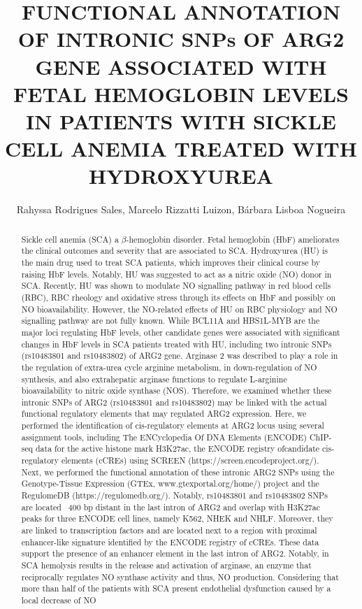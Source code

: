 \documentclass[twoside]{article}
\title{\vspace{-15mm}\fontsize{24pt}{10pt}\selectfont\textbf{ FUNCTIONAL ANNOTATION OF INTRONIC SNPs OF ARG2 GENE ASSOCIATED WITH FETAL HEMOGLOBIN LEVELS IN PATIENTS WITH SICKLE CELL ANEMIA TREATED WITH HYDROXYUREA }} %
\author{ Rahyssa Rodrigues Sales,  Marcelo Rizzatti Luizon,  B\'arbara Lisboa Nogueira }
\affil{ Universidade federal de minas gerais,  UNIVERSIDADE FEDERAL DE MINAS GERAIS }
\date{}
\begin{document}
  
  
  \maketitle %
  
  
  \thispagestyle{fancy} %
  
  
  \begin{abstract}
  Sickle cell anemia (SCA) a $\beta$-hemoglobin disorder. Fetal hemoglobin (HbF) ameliorates the clinical outcomes and severity that are associated to SCA. Hydroxyurea (HU) is the main drug used to treat SCA patients,  which improves their clinical course by raising HbF levels. Notably,  HU was suggested to act as a nitric oxide (NO) donor in SCA. Recently,  HU was shown to modulate NO signalling pathway in red blood cells (RBC),  RBC rheology and oxidative stress through its effects on HbF and possibly on NO bioavailability. However,  the NO-related effects of HU on RBC physiology and NO signalling pathway are not fully known. While BCL11A and HBS1L-MYB are the major loci regulating HbF levels,  other candidate genes were associated with significant changes in HbF levels in SCA patients treated with HU,  including two intronic SNPs (rs10483801 and rs10483802) of ARG2 gene. Arginase 2 was described to play a role in the regulation of extra-urea cycle arginine metabolism,  in down-regulation of NO synthesis,  and also extrahepatic arginase functions to regulate L-arginine bioavailability to nitric oxide synthase (NOS). Therefore,  we examined whether these intronic SNPs of ARG2 (rs10483801 and rs10483802) may be linked with the actual functional regulatory elements that may regulated ARG2 expression. Here,  we performed the identification of cis-regulatory elements at ARG2 locus using several assignment tools,  including The ENCyclopedia Of DNA Elements (ENCODE) ChIP-seq data for the active histone mark H3K27ac,  the ENCODE registry ofcandidate cis-regulatory elements (cCREs) using SCREEN (https://screen.encodeproject.org/). Next,  we performed the functional annotation of these intronic ARG2 SNPs using the Genotype-Tissue Expression (GTEx,  www.gtexportal.org/home/) project and the RegulomeDB (https://regulomedb.org/). Notably,  rs10483801 and rs10483802 SNPs are located ~400 bp distant in the last intron of ARG2 and overlap with H3K27ac peaks for three ENCODE cell lines,  namely K562,  NHEK and NHLF. Moreover,  they are linked to transcription factors and are located next to a region with proximal enhancer-like signature identified by the ENCODE registry of cCREs. These data support the presence of an enhancer element in the last intron of ARG2. Notably,  in SCA hemolysis results in the release and activation of arginase,  an enzyme that reciprocally regulates NO synthase activity and thus,  NO production. Considering that more than half of the patients with SCA present endothelial dysfunction caused by a local decrease of NO 
\end{abstract}
\end{document}
